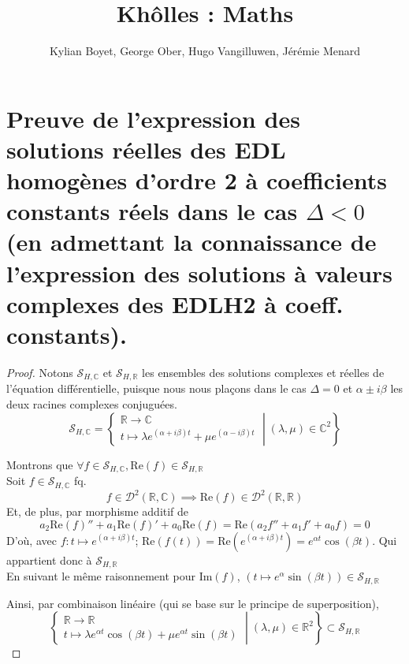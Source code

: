 \documentclass{article}
\title{Khôlles : Maths}
\author{Kylian Boyet, George Ober, Hugo Vangilluwen, Jérémie Menard}
\newcommand{\Sol}{\mathcal S}
\renewcommand{\Re}{\text{Re}}
\renewcommand{\Im}{\text{Im}}
\newcommand{\C}{\mathbb C}
\newcommand{\R}{\mathbb R}
\begin{document}
\maketitle

\flushleft

\section{Preuve de l’expression des solutions réelles des EDL homogènes d’ordre 2 à coefficients constants réels dans le cas $\Delta < 0$ (en admettant la connaissance de l’expression des solutions à valeurs complexes des EDLH2 à coeff. constants).}

\begin{proof}
	Notons $\Sol_{H, \C}$ et $\Sol_{H, \R}$ les ensembles des solutions complexes et réelles de l'équation différentielle, puisque nous nous plaçons dans le cas $\Delta = 0$ et $\alpha \pm i \beta$ les deux racines complexes conjuguées.
	$$
	\Sol_{H, \C} = 
	\left\{ 
	\begin{array}{l}
    \R \to \C  \\
    t \mapsto \lambda e^{(\alpha + i \beta) t}  + \mu e^{(\alpha - i \beta)t}
  \end{array}
	\middle\vert  (\lambda, \mu) \in \C ^2 \right\}
	
	$$
	
	Montrons que $\forall f \in \Sol_{H ,\C}, \Re(f) \in  \Sol_{H ,\R}$\\
	Soit $f \in \Sol_{H ,\C}$ fq.
	$$f \in \mathcal D^2(\R, \C) \implies \Re(f) \in \mathcal D^2(\R, \R)$$
	Et, de plus, par morphisme additif de \Re
	$$
	a_2\Re(f)'' + a_1\Re(f)' + a_0\Re(f) = \Re( a_2 f'' + a_1 f' + a_0 f) = 0
	$$
	D'où, avec $f:t \mapsto e^{(\alpha + i \beta)t}$; $\Re(f(t)) = \Re(e^{(\alpha + i \beta)t}) = e^{\alpha t } \cos (\beta t)$. Qui appartient donc à $\Sol_{H, \R}$\\
	En suivant le même raisonnement pour $\Im(f)$, $(t \mapsto e^\alpha \sin(\beta t)) \in \Sol_{H, \R}$
	
	
	Ainsi, par combinaison linéaire (qui se base sur le principe de superposition),
	$$
	\left\{ 
	\begin{array}{l}
    \R \to \R  \\
    t \mapsto \lambda e^{\alpha t } \cos (\beta t)   + \mu e^{\alpha t } \sin (\beta t)
  \end{array}
	\middle\vert  (\lambda, \mu) \in \R ^2 \right\}
	\subset \Sol_{H ,\R}

	$$
	

\end{proof}
\end{document}
